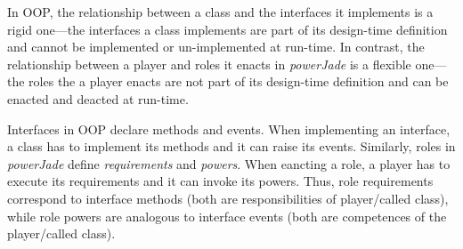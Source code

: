 In OOP, the relationship between a class and the interfaces it implements is a rigid one---the interfaces a class implements are part of its design-time definition and cannot be implemented or un-implemented at run-time.
In contrast, the relationship between a player and roles it enacts in \textit{powerJade} is a flexible one---the roles the a player enacts are not part of its design-time definition and can be enacted and deacted at run-time.

Interfaces in OOP declare methods and events.
When implementing an interface, a class has to implement its methods and it can raise its events.
Similarly, roles in \textit{powerJade} define \textit{requirements} and \textit{powers}.
When eancting a role, a player has to execute its requirements and it can invoke its powers.
Thus, role requirements correspond to interface methods (both are responsibilities of player/called class), while role powers are analogous to interface events (both are competences of the player/called class).